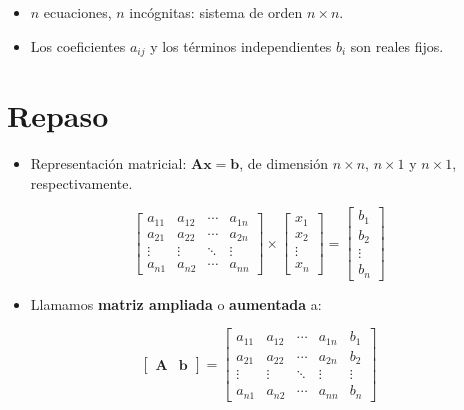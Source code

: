 \documentclass[openany]{book}
\providecommand{\tightlist}{%
  \setlength{\itemsep}{0pt}\setlength{\parskip}{0pt}}
\begin{document}
\begin{itemize}
\tightlist
\item
  \(n\) ecuaciones, \(n\) incógnitas: sistema de orden \(n \times n\).
\item
  Los coeficientes \(a_{ij}\) y los términos independientes \(b_i\) son reales fijos.
\end{itemize}

\hypertarget{repaso}{%
\section{Repaso}\label{repaso}}

\begin{itemize}
\tightlist
\item
  Representación matricial: \(\mathbf{Ax=b}\), de dimensión \(n\times n\), \(n\times 1\) y \(n\times 1\), respectivamente.
\end{itemize}

\[
\begin{bmatrix}
a_{11} & a_{12} & \cdots & a_{1n} \\
a_{21} & a_{22} & \cdots & a_{2n} \\
\vdots & \vdots & \ddots & \vdots \\
a_{n1} & a_{n2} & \cdots & a_{nn} 
\end{bmatrix}
\times 
\begin{bmatrix}
x_1 \\ x_2 \\ \vdots \\ x_n
\end{bmatrix}
=
\begin{bmatrix}
b_1 \\ b_2 \\ \vdots \\ b_n
\end{bmatrix}
\]

\begin{itemize}
\tightlist
\item
  Llamamos \textbf{matriz ampliada} o \textbf{aumentada} a:
\end{itemize}

\[
\begin{bmatrix}
    \mathbf{A} & \mathbf{b}
\end{bmatrix}
=
\begin{bmatrix}
a_{11} & a_{12} & \cdots & a_{1n} & b_1\\
a_{21} & a_{22} & \cdots & a_{2n} & b_2\\
\vdots & \vdots & \ddots & \vdots & \vdots\\
a_{n1} & a_{n2} & \cdots & a_{nn} & b_n 
\end{bmatrix}
\]
\end{document}
